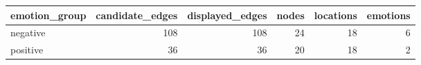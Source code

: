\begin{tabular}{lrrrrr}
\toprule
emotion\_group & candidate\_edges & displayed\_edges & nodes & locations & emotions \\
\midrule
negative & 108 & 108 & 24 & 18 & 6 \\
positive & 36 & 36 & 20 & 18 & 2 \\
\bottomrule
\end{tabular}
